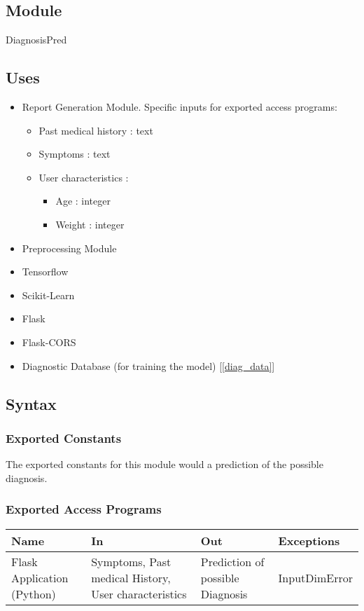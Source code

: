 \documentclass[12pt, titlepage]{article}
\begin{document}
\subsection{Module}

DiagnosisPred

\subsection{Uses}
\begin{itemize}
  \item Report Generation Module. Specific inputs for exported access programs:
    \begin{itemize}
      \item Past medical history : text
      \item Symptoms : text
      \item User characteristics :
        \begin{itemize}
          \item Age : integer
          \item Weight : integer
        \end{itemize}
    \end{itemize}
  \item Preprocessing Module
  \item Tensorflow
  \item Scikit-Learn
  \item Flask
  \item Flask-CORS
  \item Diagnostic Database (for training the model) [\ref{diag_data}]
\end{itemize}

\subsection{Syntax}

\subsubsection{Exported Constants}
The exported constants for this module would a prediction of the possible diagnosis.

\subsubsection{Exported Access Programs}

\begin{center}
\begin{tabular}{p{2cm} p{4cm} p{4cm} p{2cm}}
\hline
\textbf{Name} & \textbf{In} & \textbf{Out} & \textbf{Exceptions} \\
\hline
Flask Application (Python) & Symptoms, Past medical History, User characteristics & Prediction of possible Diagnosis & InputDimError \\
\hline
\end{tabular}
\end{center}
\end{document}
